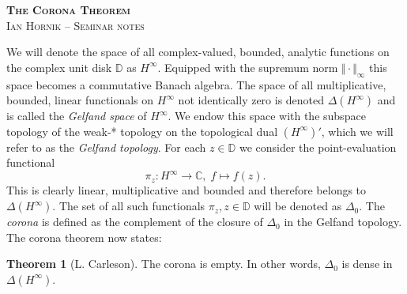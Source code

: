 \documentclass[letterpaper, 11pt]{article}
\newcommand{\C}{\mathbb{C}}
\newcommand{\D}{\mathbb{D}}
\newcommand{\1}{\mathds{1}}
\theoremstyle{definition}
\newtheorem{theorem}{Theorem}
\begin{document}
\author{\normalsize Ian Hornik}
\date{\vspace{-0.8em}\normalsize\today}


\begin{center}
  {\LARGE\scshape\bfseries{The Corona Theorem}} \\
  {\scshape{Ian Hornik -- Seminar notes}}
\end{center}

\vspace{1em}


We will denote the space of all complex-valued, bounded, analytic functions on the complex unit disk $\D$ as $H^\infty$. Equipped with the supremum norm $\Vert \cdot \Vert_\infty$ this space becomes a commutative Banach algebra. The space of all multiplicative, bounded, linear functionals on $H^\infty$ not identically zero is denoted $\Delta(H^\infty)$ and is called the \emph{Gelfand space} of $H^\infty$. We endow this space with the subspace topology of the weak\nobreakdash-* topology on the topological dual $(H^\infty)'$, which we will refer to as the \emph{Gelfand topology}. For each $z \in \D$ we consider the point-evaluation functional
\begin{equation*}
  \pi_z : H^\infty \to \C,\; f \mapsto f(z).
\end{equation*}
This is clearly linear, multiplicative and bounded and therefore belongs to $\Delta(H^\infty)$. The set of all such functionals $\pi_z, z \in \D$ will be denoted as $\Delta_0$. The \emph{corona} is defined as the complement of the closure of $\Delta_0$ in the Gelfand topology. The corona theorem now states:

\begin{theorem}[L. Carleson] \label{thm:corona}
  The corona is empty. In other words, $\Delta_0$ is dense in $\Delta(H^\infty)$.
\end{theorem}
\end{document}
